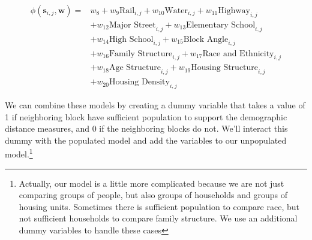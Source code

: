 \documentclass[12pt,letter]{article}\usepackage[]{graphicx}\usepackage[]{color}
\begin{document}
\begin{align}
\phi(\mathbf{s}_{i,j}, \mathbf{w}) = & w_8 
                                     + w_9\text{Rail}_{i,j} 
                                     + w_{10}\text{Water}_{i,j} 
                                     + w_{11}\text{Highway}_{i,j}\\
                                     &+ w_{12}\text{Major Street}_{i,j} 
                                     + w_{13}\text{Elementary School}_{i,j}\\
                                     &+ w_{14}\text{High School}_{i,j} 
                                     + w_{15}\text{Block Angle}_{i,j}\\
                                     &+ w_{16}\text{Family Structure}_{i,j}
                                     + w_{17}\text{Race and Ethnicity}_{i,j}\\
                                     &+ w_{18}\text{Age Structure}_{i,j}  
                                     + w_{19}\text{Housing Structure}_{i,j} \\
                                     &+ w_{20}\text{Housing Density}_{i,j}  
\end{align}

We can combine these models by creating a dummy variable that takes a
value of 1 if neighboring block have sufficient population to support
the demographic distance measures, and 0 if the neighboring blocks do
not. We'll interact this dummy with the populated model and add the
variables to our unpopulated model.\footnote{Actually, our model is
  a little more complicated because we are not just comparing
  groups of people, but also groups of households and groups of
  housing units. Sometimes there is sufficient population to compare
  race, but not sufficient households to compare family structure. We
  use an additional dummy variables to handle these cases}
\end{document}

